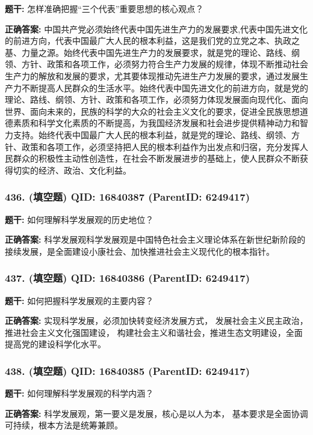 \documentclass[12pt,UTF8]{ctexart}
\begin{document}
\textbf{题干:}
怎样准确把握“三个代表”重要思想的核心观点？



\textbf{正确答案:}
中国共产党必须始终代表中国先进生产力的发展要求,代表中国先进文化的前进方向，代表中国最广大人民的根本利益，这是我们党的立党之本、执政之基、力量之源。始终代表中国先进生产力的发展要求，就是党的理论、路线、纲领、方针、政策和各项工作，必须努力符合生产力发展的规律，体现不断推动社会生产力的解放和发展的要求，尤其要体现推动先进生产力发展的要求，通过发展生产力不断提高人民群众的生活水平。始终代表中国先进文化的前进方向，就是党的理论、路线、纲领、方针、政策和各项工作，必须努力体现发展面向现代化、面向世界、面向未来的，民族的科学的大众的社会主义文化的要求，促进全民族思想道德素质和科学文化素质的不断提高，为我国经济发展和社会进步提供精神动力和智力支持。始终代表中国最广大人民的根本利益，就是党的理论、路线、纲领、方针、政策和各项工作，必须坚持把人民的根本利益作为出发点和归宿，充分发挥人民群众的积极性主动性创造性，在社会不断发展进步的基础上，使人民群众不断获得切实的经济、政治、文化利益。

\vspace{0.3em}\hrulefill\vspace{0.7em}

\subsubsection*{436. (填空题) \small QID: 16840387 (ParentID: 6249417)}

\textbf{题干:}
如何理解科学发展观的历史地位？



\textbf{正确答案:}
科学发展观科学发展观是中国特色社会主义理论体系在新世纪新阶段的接续发展，是全面建设小康社会、加快推进社会主义现代化的根本指针。

\vspace{0.3em}\hrulefill\vspace{0.7em}

\subsubsection*{437. (填空题) \small QID: 16840386 (ParentID: 6249417)}

\textbf{题干:}
如何把握科学发展观的主要内容？



\textbf{正确答案:}
实现科学发展，必须加快转变经济发展方式， 发展社会主义民主政治，推进社会主义文化强国建设， 构建社会主义和谐社会，推进生态文明建设，全面提高党的建设科学化水平。

\vspace{0.3em}\hrulefill\vspace{0.7em}

\subsubsection*{438. (填空题) \small QID: 16840385 (ParentID: 6249417)}

\textbf{题干:}
如何理解科学发展观的科学内涵？



\textbf{正确答案:}
科学发展观，第一要义是发展，核心是以人为本， 基本要求是全面协调可持续，根本方法是统筹兼顾。

\vspace{0.3em}\hrulefill\vspace{0.7em}
\end{document}
